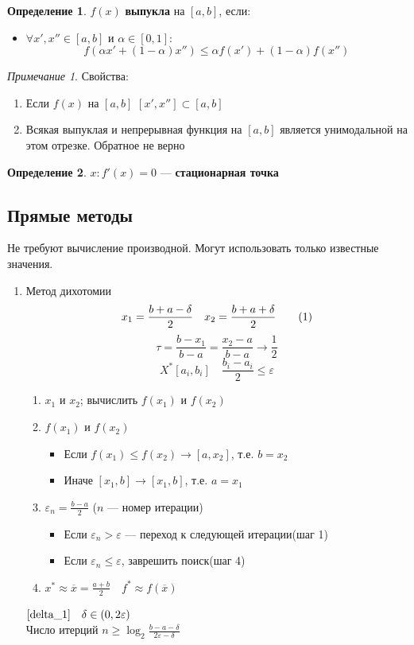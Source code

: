 \documentclass[oneside]{book}
\newcommand\addtag{\refstepcounter{equation}\tag{\theequation}}
\theoremstyle{plain}
\theoremstyle{remark}
\newtheorem*{remark}{Примечание}
\theoremstyle{definition}
\newtheorem*{definition}{Определение}
\begin{document}
\begin{definition}
\(f(x)\) \textbf{выпукла} на \([a, b]\), если:
\begin{itemize}
\item \(\forall x', x'' \in [a, b]\) и \(\alpha \in [0, 1]\): \\
\[ f(\alpha x' + (1 - \alpha)x'') \le \alpha f(x') + (1 - \alpha)f(x'') \]
\end{itemize}
\end{definition}
\begin{remark}
Свойства:
\begin{enumerate}
\item Если \(f(x)\) на \([a, b]\) \([x', x''] \subset [a, b]\)
\item Всякая выпуклая и непрерывная функция на \([a, b]\) является унимодальной на этом отрезке. Обратное не верно
\end{enumerate}
\end{remark}
\begin{definition}
\(x: f'(x) = 0\) --- \textbf{стационарная точка}
\end{definition}


\subsection{Прямые методы}
\label{sec:org8a1d1ab}
Не требуют вычисление производной. Могут использовать только известные значения. 
\begin{enumerate}
\item Метод дихотомии
\label{sec:orgdebb131}
\[ x_1 = \frac{b + a - \delta}{2}\quad x_2 = \frac{b + a + \delta}{2} \addtag\label{delta_1} \]
\[ \tau = \frac{b - x_1}{b - a} = \frac{x_2 - a}{b - a} \rightarrow \frac{1}{2} \]
\[ X^* [a_i, b_i]\quad \frac{b_i - a_i}{2} \le \varepsilon \]

\begin{enumerate}
\item \(x_1\) и \(x_2\); вычислить \(f(x_1)\) и \(f(x_2)\)
\item \(f(x_1)\) и \(f(x_2)\)
\begin{itemize}
\item Если \(f(x_1) \le f(x_2) \rightarrow [a, x_2]\), т.е. \(b = x_2\)
\item Иначе \([x_1, b] \rightarrow [x_1, b]\), т.е. \(a = x_1\)
\end{itemize}
\item \(\varepsilon_n = \frac{b - a}{2}\) (\(n\) --- номер итерации)
\begin{itemize}
\item Если \(\varepsilon_n > \varepsilon\) --- переход к следующей итерации(шаг 1)
\item Если \(\varepsilon_n \le \varepsilon\), заврешить поиск(шаг 4)
\end{itemize}
\item \(x^* \approx \overline{x} = \frac{a + b}{2} \quad f^* \approx f(\overline{x})\)
\end{enumerate}

\(\ref{delta_1}\quad \delta \in (0, 2\varepsilon)\) \\
Число итерций \(n \ge \log_2\frac{b - a - \delta}{2\varepsilon - \delta}\)
\end{enumerate}
\end{document}
